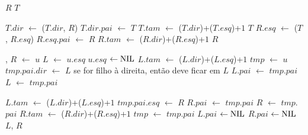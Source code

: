 \begin{algorithm}
\caption{\treapJoin($T$, $R$)}
\label{Algo:TREAPjoin}
\begin{algorithmic}[1]
 \Return $R$
\EndIf
{} \Return $T$
\EndIf

  \State $T$.$dir$ $\gets$ \treapJoin($T$.$dir$, $R$)
  \State $T$.$dir$.$pai$ $\gets$ $T$
  \State $T$.$tam$ $\gets$ \treapGetSize($T$.$dir$)+\treapGetSize($T$.$esq$)+$1$
  \State \Return $T$
\Else 
  \State $R$.$esq$ $\gets$ \treapJoin($T$, $R$.$esq$)
  \State $R$.$esq$.$pai$ $\gets$ $R$
  \State $R$.$tam$ $\gets$ \treapGetSize($R$.$dir$)+\treapGetSize($R$.$esq$)+$1$
  \State \Return $R$
\EndIf
\end{algorithmic}
\end{algorithm}
\begin{algorithm}
\caption{\treapSplit($u$)}
\label{Algo:TREAPsplit}
\begin{algorithmic}[1]
 \Return \Nil, \Nil
\EndIf
\State $R$ $\gets $ $u$
\State $L$ $\gets $ $u$.$esq$
\State $u$.$esq$ $\gets\text{NIL}$
 $L$.$tam$ $\gets$ \treapGetSize($L$.$dir$)+\treapGetSize($L$.$esq$)+$1$
\EndIf
\State $tmp$ $\gets$ $u$
    \State $tmp$.$pai$.$dir$ $\gets$ $L$ \Comment se for filho à direita, então deve ficar em $L$
     $L$.$pai$ $\gets$ $tmp$.$pai$
    \EndIf
    \State $L$ $\gets$ $tmp$.$pai$

    \State $L$.$tam$ $\gets$ \treapGetSize($L$.$dir$)+\treapGetSize($L$.$esq$)+$1$
  \Else
    \State $tmp$.$pai$.$esq$ $\gets$ $R$
     $R$.$pai$ $\gets$ $tmp$.$pai$
    \EndIf
    \State $R$ $\gets$ $tmp$.$pai$
    \State $R$.$tam$ $\gets$ \treapGetSize($R$.$dir$)+\treapGetSize($R$.$esq$)+$1$
  \EndIf
  \State $tmp$ $\gets$ $tmp$.$pai$
\EndWhile
{} $L$.$pai$ $\gets\text{NIL}$\EndIf
{} $R$.$pai$ $\gets\text{NIL}$\EndIf
\State\Return $L$, $R$
\end{algorithmic}
\end{algorithm}



\newpage

